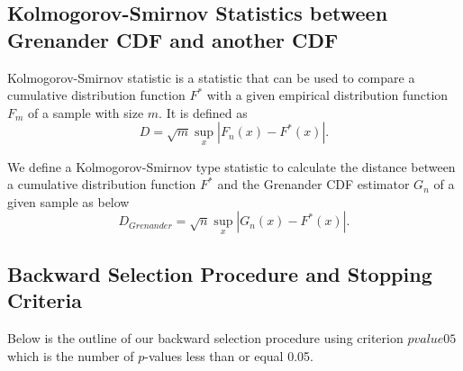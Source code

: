 \documentclass[12pt, letter]{article}\usepackage[]{graphicx}\usepackage[]{color}
\begin{document}
\subsection{Kolmogorov-Smirnov Statistics between Grenander CDF and another CDF}
Kolmogorov-Smirnov statistic is a statistic that can be used to compare a cumulative distribution function $F^*$ with a given empirical distribution function $F_m$ of a sample with size $m$.  It is defined as
\[
D  = \sqrt{m}\sup_{x} |F_n(x)-F^*(x)|.
\]

We define a  Kolmogorov-Smirnov type statistic to calculate the distance between a cumulative distribution function $F^*$ and the Grenander CDF estimator $G_n$  of a given sample as below
\[
D_{Grenander} = \sqrt{n} \sup_{x} |G_n(x)-F^*(x)|.
\]

\subsection{ Backward Selection Procedure and Stopping Criteria}
Below is the outline of our backward selection procedure using criterion $pvalue05$ which is the number of $p$-values less than or equal 0.05. 
\end{document}
